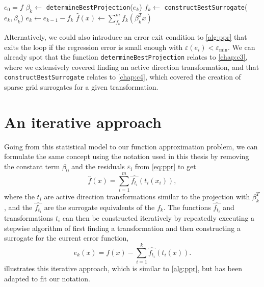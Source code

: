 \documentclass[
  a4paper,  %
  twoside,  %
  bibliography=totoc,
  headsepline,
  cleardoublepage=empty,
  parskip=half,
  draft=false
]{scrbook}
\begin{document}
\begin{mdframed}[style=algstyle,frametitle={\textbf{function} \texttt{projectionPursuitRegression}{$(f, k_{\text{max}})$}}]
\normalsize
\vspace{5.5mm}
\begin{algorithmic}[1]

    \State $e_0 = f$
    	\State $\beta_k \gets$ \texttt{determineBestProjection}($e_k$)
    	\State $f_k \gets$ \texttt{constructBestSurrogate}($e_k, \beta_k$)
    	\State $e_k \gets e_{k - 1} - f_k$
    \EndFor
    \State $\hat{f}(x) \gets \sum_{f_k}^m f_k(\beta_k^T x)$
    \State {}
\end{algorithmic}

\vspace{-1.5mm}
\delimit

	\label{alg:ppr}
\end{mdframed}
%
Alternatively, we could also introduce an error exit condition to \cref{alg:ppr} that exits the loop if the regression error is small enough with $\varepsilon(e_i) < \varepsilon_{\mathrm{min}}$.
We can already spot that the function \texttt{determineBestProjection} relates to \cref{chap:c3}, where we extensively covered finding an active direction transformation, and that \texttt{constructBestSurrogate} relates to \cref{chap:c4}, which covered the creation of sparse grid surrogates for a given transformation.

\section{An iterative approach}
\label{sec:it}

Going from this statistical model to our function approximation problem, we can formulate the same concept using the notation used in this thesis by removing the constant term $\beta_0$ and the residuals $\varepsilon_i$ from \cref{eq:ppr} to get
\begin{equation}
\hat{f}(x)=\sum_{i=1}^m \hat{f_{t_i}}(t_i(x_i)),
\end{equation}
%
where the $t_i$ are active direction transformations similar to the projection with $\beta_k^T$, and the $\hat{f_{t_i}}$ are the surrogate equivalents of the $f_k$.
The functions $\hat{f_{t_i}}$ and transformations $t_i$ can then be constructed iteratively by repeatedly executing a stepwise algorithm of first finding a transformation and then constructing a surrogate for the current error function,
\begin{equation}
e_k(x)=f(x) - \sum_{i=1}^k \hat{f_{t_i}}(t_i(x)).
\end{equation}
%
 illustrates this iterative approach, which is similar to \cref{alg:ppr}, but has been adapted to fit our notation.
\end{document}
